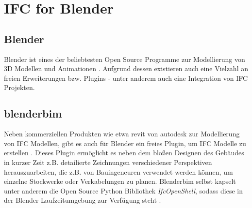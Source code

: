 \section{IFC for Blender}
\subsection{Blender}
Blender ist eines der beliebtesten Open Source Programme zur Modellierung von 3D Modellen und Animationen \cite{blendero56:online}.
Aufgrund dessen existieren auch eine Vielzahl an freien Erweiterungen bzw. Plugins - unter anderem auch eine Integration von IFC Projekten.

\subsection{blenderbim}
Neben kommerziellen Produkten wie etwa revit von autodesk \cite{RevitSof26:online} zur Modellierung von IFC Modellen, gibt es auch für Blender ein freies Plugin, um IFC Modelle zu erstellen \cite{BlenderB43:online}.
Dieses Plugin ermöglicht es neben dem bloßen Designen des Gebäudes in kurzer Zeit z.B. detailierte Zeichnungen verschiedener Perspektiven herauszuarbeiten, die z.B. von Bauingeneuren verwendet werden können, um einzelne Stockwerke oder Verkabelungen zu planen.
Blenderbim selbst kapselt unter anderem die Open Source Python Bibliothek \textit{IfcOpenShell}, sodass diese in der Blender Laufzeitumgebung zur Verfügung steht \cite{IFCOpenShell:online}.

